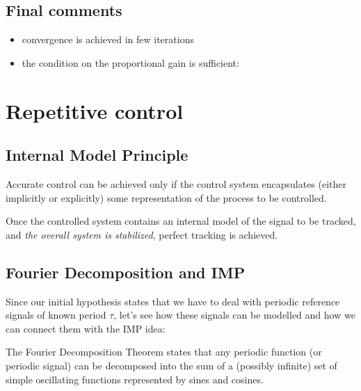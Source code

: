 \documentclass{book}
\begin{document}
\subsection{Final comments}
\begin{itemize}
    \item convergence is achieved in few iterations 
    \item  the condition on the proportional gain is sufficient: 
\end{itemize}


\section{Repetitive control}
\subsection{Internal Model Principle}
Accurate control can be achieved only if the control system encapsulates (either implicitly or explicitly) some representation of the process to be controlled. 

Once the controlled system contains an internal model of the signal to be tracked, and \emph{the overall system is stabilized}, perfect tracking is achieved. 
\subsection{Fourier Decomposition and IMP}
Since our initial hypothesis states that we have to deal with periodic reference signals of known period $\tau$, let's see how these signals can be modelled and how we can connect them with the IMP idea: 

The Fourier Decomposition Theorem states that any periodic function (or periodic signal) can be decomposed into the sum of a (possibly infinite) set of simple oscillating functions represented by sines and cosines. 
\end{document}
